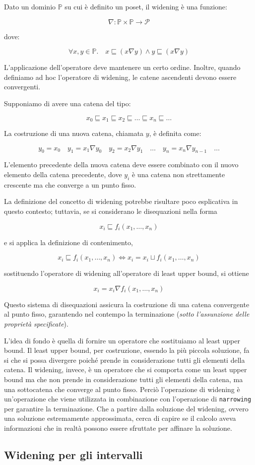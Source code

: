Dato un dominio $\mathbb{P}$ su cui è definito un poset, il widening è una funzione:

\[
\nabla : \mathbb{P} \times \mathbb{P} \rightarrow \mathcal{P}
\]

dove:

\[
\forall x,y \in \mathbb{P} . \quad x \sqsubseteq (x \nabla y) \land y \sqsubseteq (x \nabla y)
\]

L'applicazione dell'operatore deve mantenere un certo ordine. Inoltre, quando definiamo
ad hoc l'operatore di widening, le catene ascendenti devono essere convergenti.

Supponiamo di avere una catena del tipo:

\[
x_0 \sqsubseteq x_1 \sqsubseteq x_2 \sqsubseteq \dots \sqsubseteq x_n \sqsubseteq \dots
\]

La costruzione di una nuova catena, chiamata $y$, è definita come:

\[
y_0 = x_0 \quad y_1 = x_1 \nabla y_0 \quad y_{2} = x_2 \nabla y_1 \quad \dots \quad y_n
= x_n \nabla y_{n-1} \quad \dots
\]

L'elemento precedente della nuova catena deve essere combinato con il nuovo elemento della
catena precedente, dove $y_i$ è una catena non strettamente crescente ma che converge a
un punto fisso.

La definizione del concetto di widening potrebbe risultare poco esplicativa in questo
contesto; tuttavia, se si considerano le disequazioni nella forma

\[
  x_i \sqsubseteq f_i(x_1, \dots, x_n)
\]

e si applica la definizione di contenimento,

\[
  x_i \sqsubseteq f_i(x_1, \dots, x_n) \iff x_i = x_i \sqcup f_i(x_1, \dots, x_n)  
\]

sostituendo l'operatore di widening all'operatore di least upper bound, si ottiene

\begin{equation}
    x_i = x_i \nabla f_i(x_1, \dots, x_n)
\end{equation}

Questo sistema di disequazioni assicura la costruzione di una catena convergente al punto fisso,
garantendo nel contempo la terminazione (\textit{sotto l'assunzione delle proprietà specificate}).

L'idea di fondo è quella di fornire un operatore che sostituiamo al least upper bound. 
Il least upper bound, per costruzione, essendo la più piccola soluzione, fa si che si 
possa divergere poiché prende in considerazione tutti gli elementi della catena.
Il widening, invece, è un operatore che si comporta come un least upper bound ma che
non prende in considerazione tutti gli elementi della catena, ma una sottocatena 
che converge al punto fisso.
Perciò l'operazione di widening è un'operazione che viene utilizzata in combinazione 
con l'operazione di \texttt{narrowing} per garantire la terminazione. Che a partire 
dalla soluzione del widening, ovvero una soluzione estremamente approssimata, 
cerca di capire se il calcolo aveva informazioni che in realtà possono essere
sfruttate per affinare la soluzione. 
\subsection{Widening per gli intervalli}
